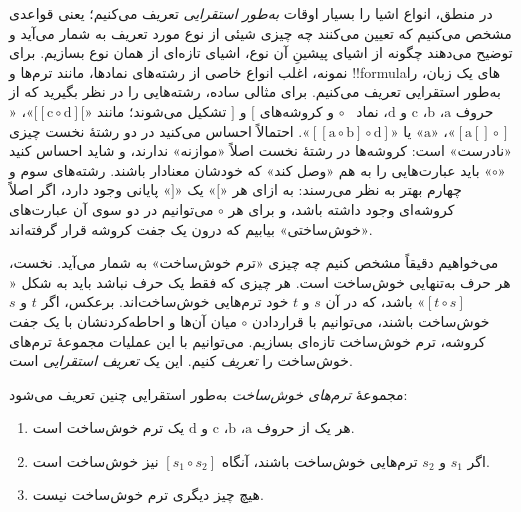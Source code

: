 \documentclass[../../../include/open-logic-section]{subfiles}
\begin{document}


در منطق، انواع اشیا را بسیار اوقات \emph{به‌طور استقرایی} تعریف
می‌کنیم؛ یعنی قواعدی مشخص می‌کنیم که تعیین می‌کنند چه چیزی شیئی از نوع
مورد تعریف به شمار می‌آید و توضیح می‌دهند چگونه از اشیای پیشینِ آن نوع،
اشیای تازه‌ای از همان نوع بسازیم. برای نمونه، اغلب انواع خاصی از
رشته‌های نمادها، مانند ترم‌ها و !!{formula}های یک زبان، را به‌طور
استقرایی تعریف می‌کنیم. برای مثالی ساده، رشته‌هایی را در نظر بگیرید که
از حروف $\mathrm{a}$، $\mathrm{b}$، $\mathrm{c}$ و $\mathrm{d}$، نماد
~$\circ$ و کروشه‌های $[$ و $]$ تشکیل می‌شوند؛ مانند
«$[[\mathrm{c} \circ \mathrm{d}][$»، «$[\mathrm{a}[]\circ]$»،
«$\mathrm{a}$» یا
«$[[\mathrm{a} \circ \mathrm{b}]\circ \mathrm{d}]$». احتمالاً احساس
می‌کنید در دو رشتهٔ نخست چیزی «نادرست» است: کروشه‌ها در رشتهٔ نخست
اصلاً «موازنه» ندارند، و شاید احساس کنید «$\circ$» باید عبارت‌هایی را
به هم «وصل کند» که خودشان معنادار باشند. رشته‌های سوم و چهارم بهتر به
نظر می‌رسند: به ازای هر «$[$» یک «$]$» پایانی وجود دارد، اگر اصلاً
کروشه‌ای وجود داشته باشد، و برای هر $\circ$ می‌توانیم در دو سوی آن
عبارت‌های «خوش‌ساختی» بیابیم که درون یک جفت کروشه قرار گرفته‌اند.

می‌خواهیم دقیقاً مشخص کنیم چه چیزی «ترم خوش‌ساخت» به شمار می‌آید. نخست،
هر حرف به‌تنهایی خوش‌ساخت است. هر چیزی که فقط یک حرف نباشد باید به شکل
«$[t \circ s]$» باشد، که در آن $s$ و $t$ خود ترم‌هایی خوش‌ساخت‌اند.
برعکس، اگر $t$ و $s$ خوش‌ساخت باشند، می‌توانیم با قراردادن $\circ$
میان آن‌ها و احاطه‌کردنشان با یک جفت کروشه، ترم خوش‌ساخت تازه‌ای بسازیم.
می‌توانیم با این عملیات مجموعهٔ ترم‌های خوش‌ساخت را \emph{تعریف} کنیم.
این یک \emph{تعریف استقرایی} است.

\begin{defn}
  مجموعهٔ \emph{ترم‌های خوش‌ساخت} به‌طور استقرایی چنین تعریف می‌شود:
  \begin{enumerate}
  \item هر یک از حروف $\mathrm{a}$، $\mathrm{b}$، $\mathrm{c}$ و
    $\mathrm{d}$ یک ترم خوش‌ساخت است.
  \item اگر $s_1$ و $s_2$ ترم‌هایی خوش‌ساخت باشند، آنگاه
    $[s_1 \circ s_2]$ نیز خوش‌ساخت است.
  \item هیچ چیز دیگری ترم خوش‌ساخت نیست.
  \end{enumerate}
\end{defn}
\end{document}
